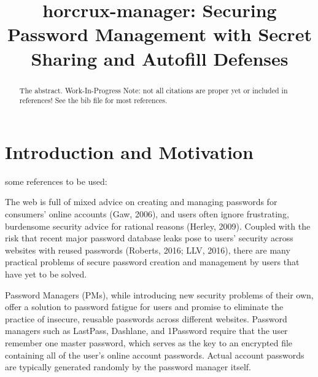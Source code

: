 \documentclass[conference]{IEEEtran}
\begin{document}
\title{horcrux-manager: Securing Password Management with Secret Sharing and
Autofill Defenses}

\author{

}
\maketitle

\begin{abstract}
The abstract. Work-In-Progress Note: not all citations are proper yet or
  included in references! See the bib file for most references.
\end{abstract}

\section{Introduction and Motivation}

some references to be used:
\cite{silver2014password}
\cite{ion2015no}
\cite{li2014emperor}
\cite{goodin2015}
\cite{das2014tangled}
\cite{khandelwal2016}
\cite{titcomb2015}
\cite{shamir1979share}


The web is full of mixed advice on creating and managing passwords for consumers'
online accounts  (Gaw, 2006), and users often ignore frustrating, burdensome
security advice for rational reasons (Herley, 2009). Coupled with the risk that
recent major password database leaks pose to users' security across websites
with reused passwords (Roberts, 2016; LLV, 2016), there are many practical
problems of secure password creation and management by users that have yet to be
solved.


Password Managers (PMs), while introducing new security problems of their own,
offer a solution to password fatigue for users and promise
to eliminate the practice of insecure, reusable passwords across different
websites.  Password managers such as LastPass, Dashlane, and 1Password 
require that the user remember one master password, which serves as
the key to an encrypted file containing all of the user's online account
passwords. Actual account passwords are typically generated randomly by the password manager
itself.
\end{document}
